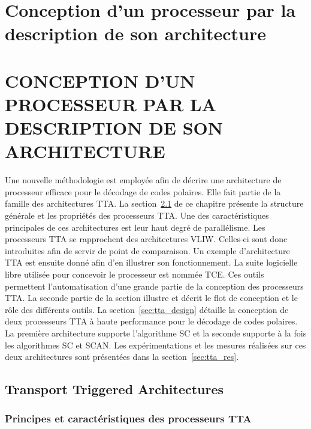 {
\chapter{Conception d'un processeur par la description de son architecture} %
\label{chap:tta}
}
{
\chapter{CONCEPTION D'UN PROCESSEUR PAR LA DESCRIPTION DE SON ARCHITECTURE} %
\label{chap:tta}
}


Une nouvelle méthodologie est employée afin de décrire une architecture de processeur efficace pour le décodage de codes polaires. Elle fait partie de la famille des architectures TTA. La section~\ref{sec:tta_description} de ce chapitre présente la structure générale et les propriétés des processeurs TTA. Une des caractéristiques principales de ces architectures est leur haut degré de parallélisme. Les processeurs TTA se rapprochent des architectures VLIW. Celles-ci sont donc introduites afin de servir de point de comparaison. Un exemple d'architecture TTA est ensuite donné afin d'en illustrer son fonctionnement. La suite logicielle libre utilisée pour concevoir le processeur est nommée TCE. Ces outils permettent l'automatisation d'une grande partie de la conception des processeurs TTA. La seconde partie de la section illustre et décrit le flot de conception et le rôle des différents outils. La section~\ref{sec:tta_design} détaille la conception de deux processeurs TTA à haute performance pour le décodage de codes polaires. La première architecture supporte l'algorithme SC et la seconde supporte à la fois les algorithmes SC et SCAN. Les expérimentations et les mesures réalisées sur ces deux architectures sont présentées dans la section~\ref{sec:tta_res}.

{
\vspace*{\fill}
\minitocTITI
\vspace*{\fill}
\newpage
}
{
}

\section{Transport Triggered Architectures}
\label{sec:tta_description}

\subsection{Principes et caractéristiques des processeurs TTA}

